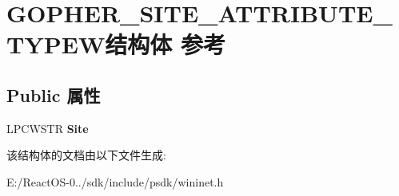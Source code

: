 \hypertarget{struct_g_o_p_h_e_r___s_i_t_e___a_t_t_r_i_b_u_t_e___t_y_p_e_w}{}\section{G\+O\+P\+H\+E\+R\+\_\+\+S\+I\+T\+E\+\_\+\+A\+T\+T\+R\+I\+B\+U\+T\+E\+\_\+\+T\+Y\+P\+E\+W结构体 参考}
\label{struct_g_o_p_h_e_r___s_i_t_e___a_t_t_r_i_b_u_t_e___t_y_p_e_w}
\subsection*{Public 属性}
\begin{DoxyCompactItemize}
\item 
\mbox{\label{struct_g_o_p_h_e_r___s_i_t_e___a_t_t_r_i_b_u_t_e___t_y_p_e_w_a7e8c0dd6fb88293754a570c8e85edf2e}} 
L\+P\+C\+W\+S\+TR {\bfseries Site}
\end{DoxyCompactItemize}


该结构体的文档由以下文件生成\+:\begin{DoxyCompactItemize}
\item 
E\+:/\+React\+O\+S-\/0../sdk/include/psdk/wininet.\+h\end{DoxyCompactItemize}
